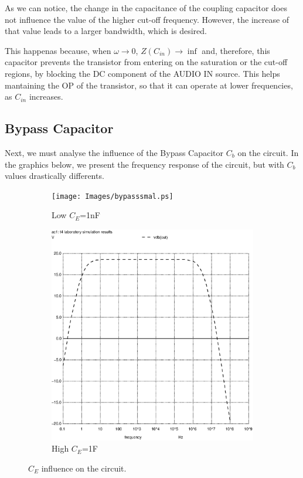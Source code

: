 As we can notice, the change in the capacitance of the coupling capacitor does not influence the value of the higher cut-off frequency. However, the increase of that value leads to a larger bandwidth, which is desired.

This happenas because, when $\omega \to 0$, $Z(C_{in}) \to \inf$ and, therefore, this capacitor prevents the transistor from entering on the saturation or the cut-off regions, by blocking the DC component of the AUDIO IN source. This helps mantaining the OP of the transistor, so that it can operate at lower frequencies, as $C_{in}$ increases.


\subsection{Bypass Capacitor}
Next, we must analyse the influence of the Bypass Capacitor $C_b$ on the circuit. In the graphics below, we present the frequency response of the circuit, but with $C_b$ values drastically differents.

\begin{figure}[h]
\centering
\begin{subfigure}{.5\textwidth}
    \centering
    \texttt{[image: Images/bypasssmal.ps]}
    \caption{Low $C_E$=1nF}
\end{subfigure}%
\begin{subfigure}{.5\textwidth}
    \centering
    \includegraphics[scale=0.33]{images/bypassbig.ps}
    \caption{High $C_E$=1F}
\end{subfigure}
\caption{$C_E$ influence on the circuit.}
\end{figure}

